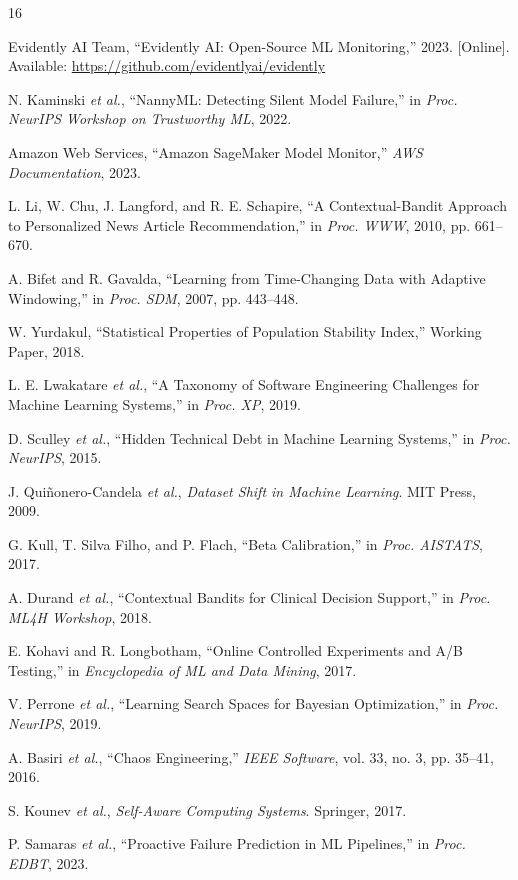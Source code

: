 \documentclass[conference]{IEEEtran}
\begin{document}
\begin{thebibliography}{16}

Evidently AI Team, ``Evidently AI: Open-Source ML Monitoring,'' 2023.
[Online]. Available: \url{https://github.com/evidentlyai/evidently}

N. Kaminski \textit{et al.}, ``NannyML: Detecting Silent Model Failure,''
in \textit{Proc. NeurIPS Workshop on Trustworthy ML}, 2022.

Amazon Web Services, ``Amazon SageMaker Model Monitor,''
\textit{AWS Documentation}, 2023.

L. Li, W. Chu, J. Langford, and R. E. Schapire, ``A Contextual-Bandit
Approach to Personalized News Article Recommendation,''
in \textit{Proc. WWW}, 2010, pp. 661--670.

A. Bifet and R. Gavalda, ``Learning from Time-Changing Data with Adaptive
Windowing,'' in \textit{Proc. SDM}, 2007, pp. 443--448.

W. Yurdakul, ``Statistical Properties of Population Stability Index,''
Working Paper, 2018.

L. E. Lwakatare \textit{et al.}, ``A Taxonomy of Software Engineering
Challenges for Machine Learning Systems,'' in \textit{Proc. XP}, 2019.

D. Sculley \textit{et al.}, ``Hidden Technical Debt in Machine Learning
Systems,'' in \textit{Proc. NeurIPS}, 2015.

J. Qui\~{n}onero-Candela \textit{et al.},
\textit{Dataset Shift in Machine Learning}. MIT Press, 2009.

G. Kull, T. Silva Filho, and P. Flach, ``Beta Calibration,''
in \textit{Proc. AISTATS}, 2017.

A. Durand \textit{et al.}, ``Contextual Bandits for Clinical Decision
Support,'' in \textit{Proc. ML4H Workshop}, 2018.

E. Kohavi and R. Longbotham, ``Online Controlled Experiments and A/B
Testing,'' in \textit{Encyclopedia of ML and Data Mining}, 2017.

V. Perrone \textit{et al.}, ``Learning Search Spaces for Bayesian
Optimization,'' in \textit{Proc. NeurIPS}, 2019.

A. Basiri \textit{et al.}, ``Chaos Engineering,''
\textit{IEEE Software}, vol. 33, no. 3, pp. 35--41, 2016.

S. Kounev \textit{et al.}, \textit{Self-Aware Computing Systems}.
Springer, 2017.

P. Samaras \textit{et al.}, ``Proactive Failure Prediction in ML
Pipelines,'' in \textit{Proc. EDBT}, 2023.

\end{thebibliography}
\end{document}

